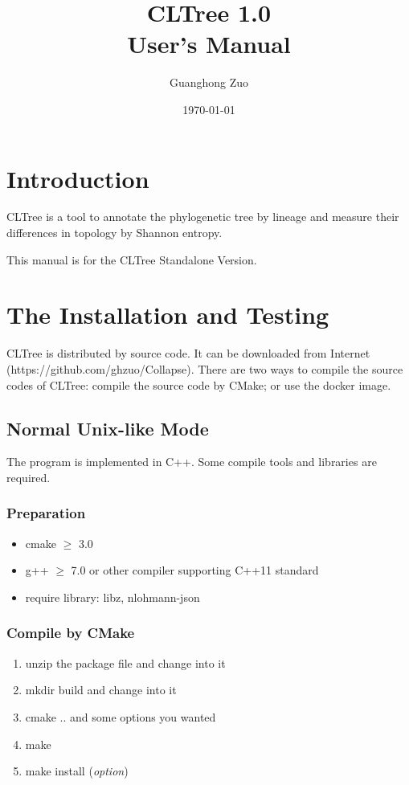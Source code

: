 \documentclass[12pt,a4paper]{article}
\begin{document}
\title{CLTree 1.0 \\ User's Manual}
\author{Guanghong Zuo}
\date{\today}
\maketitle


\section{Introduction}
CLTree is a tool to annotate the phylogenetic tree by lineage and
measure their differences in topology by Shannon entropy.

This manual is for the CLTree Standalone Version.

\section{The Installation and Testing}

CLTree is distributed by source code. It can be downloaded from Internet (https://github.com/ghzuo/Collapse). There are two ways to compile the source codes of CLTree: compile the source code by CMake; or use the docker image.

\subsection{Normal Unix-like Mode}

The program is implemented in C++.  Some compile tools and libraries are required.

\subsubsection{Preparation} 
\begin{itemize}
	\item cmake $\geq$ 3.0
	\item g++ $\geq$ 7.0 or other compiler supporting C++11 standard
	\item require library: libz, nlohmann-json
	\end{itemize}

\subsubsection{Compile by CMake} 
\begin{enumerate}
	\item unzip the package file and change into it
	\item mkdir build and change into it
	\item cmake .. and some options you wanted
	\item make  
	\item make install ({\it option})
\end{enumerate}
\end{document}
